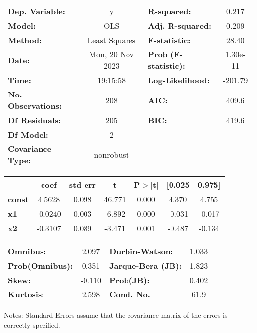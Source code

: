 \begin{center}
\begin{tabular}{lclc}
\toprule
\textbf{Dep. Variable:}    &        y         & \textbf{  R-squared:         } &     0.217   \\
\textbf{Model:}            &       OLS        & \textbf{  Adj. R-squared:    } &     0.209   \\
\textbf{Method:}           &  Least Squares   & \textbf{  F-statistic:       } &     28.40   \\
\textbf{Date:}             & Mon, 20 Nov 2023 & \textbf{  Prob (F-statistic):} &  1.30e-11   \\
\textbf{Time:}             &     19:15:58     & \textbf{  Log-Likelihood:    } &   -201.79   \\
\textbf{No. Observations:} &         208      & \textbf{  AIC:               } &     409.6   \\
\textbf{Df Residuals:}     &         205      & \textbf{  BIC:               } &     419.6   \\
\textbf{Df Model:}         &           2      & \textbf{                     } &             \\
\textbf{Covariance Type:}  &    nonrobust     & \textbf{                     } &             \\
\bottomrule
\end{tabular}
\begin{tabular}{lcccccc}
               & \textbf{coef} & \textbf{std err} & \textbf{t} & \textbf{P$> |$t$|$} & \textbf{[0.025} & \textbf{0.975]}  \\
\midrule
\textbf{const} &       4.5628  &        0.098     &    46.771  &         0.000        &        4.370    &        4.755     \\
\textbf{x1}    &      -0.0240  &        0.003     &    -6.892  &         0.000        &       -0.031    &       -0.017     \\
\textbf{x2}    &      -0.3107  &        0.089     &    -3.471  &         0.001        &       -0.487    &       -0.134     \\
\bottomrule
\end{tabular}
\begin{tabular}{lclc}
\textbf{Omnibus:}       &  2.097 & \textbf{  Durbin-Watson:     } &    1.033  \\
\textbf{Prob(Omnibus):} &  0.351 & \textbf{  Jarque-Bera (JB):  } &    1.823  \\
\textbf{Skew:}          & -0.110 & \textbf{  Prob(JB):          } &    0.402  \\
\textbf{Kurtosis:}      &  2.598 & \textbf{  Cond. No.          } &     61.9  \\
\bottomrule
\end{tabular}
\end{center}

Notes: \newline
 [1] Standard Errors assume that the covariance matrix of the errors is correctly specified.